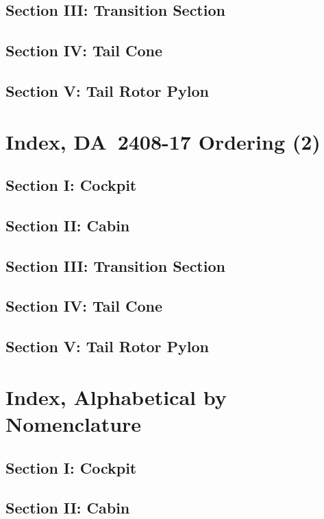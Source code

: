 \documentclass[letterpaper,11pt,openany,oneside]{book}
\begin{document}
\section{Section III: Transition Section}

\clearpage
\section{Section IV: Tail Cone}

\clearpage
\section{Section V: Tail Rotor Pylon}

\chapter{Index, DA~2408-17 Ordering (2)}
\section{Section I: Cockpit}

\clearpage
\section{Section II: Cabin}

\clearpage
\section{Section III: Transition Section}

\clearpage
\section{Section IV: Tail Cone}

\clearpage
\section{Section V: Tail Rotor Pylon}

\chapter{Index, Alphabetical by Nomenclature}
\section{Section I: Cockpit}

\clearpage
\section{Section II: Cabin}

\clearpage
\end{document}
